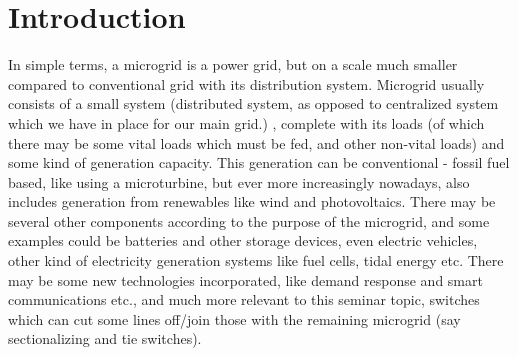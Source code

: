 \newcommand{\etas}{\ensuremath{\eta_{\mathrm{s}}}}


\chapter{Introduction}


In simple terms, a microgrid is a power grid, but on a scale much smaller compared to conventional grid with its distribution system. 
Microgrid usually consists of a small system (distributed system, as opposed to centralized system which we have in place for our main grid.) , complete with its loads (of which there may be some vital loads which must be fed, and other non-vital loads) and some kind of generation capacity. This generation can be conventional - fossil fuel based, like using a microturbine, but ever more increasingly nowadays, also includes generation from renewables like wind and photovoltaics. There may be several other components according to the purpose of the microgrid, and some examples could be batteries and other storage devices, even electric vehicles, other kind of electricity generation systems like fuel cells, tidal energy etc. There may be some new technologies incorporated, like demand response and smart communications etc., and much more relevant to this seminar topic, switches which can cut some lines off/join those with the remaining microgrid (say sectionalizing and tie switches).

 
